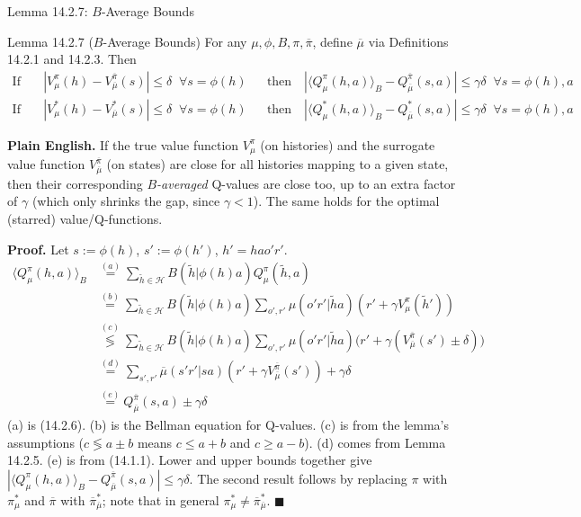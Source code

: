 \documentclass[aspectratio=169,10pt]{beamer}
\newcommand{\Hc}{\mathcal{H}}
\begin{document}
\begin{frame}[allowframebreaks]{Lemma 14.2.7: $B$-Average Bounds}
  \begin{block}{Lemma 14.2.7 ($B$-Average Bounds)}
    For any $\mu,\phi,B,\pi,\overline\pi$, define $\overline\mu$ via
    Definitions 14.2.1 and 14.2.3. Then
    \begin{align*}
      \text{If}\quad &|V_\mu^\pi(h)-V_{\overline\mu}^{\overline\pi}(s)|\le\delta \;\;\forall s=\phi(h)
      &&\text{then}\quad |\langle Q_\mu^\pi(h,a)\rangle_B - Q_{\overline\mu}^{\overline\pi}(s,a)| \le \gamma\delta \;\;\forall s=\phi(h),a\\
      \text{If}\quad &|V_\mu^*(h)-V_{\overline\mu}^*(s)|\le\delta \;\;\forall s=\phi(h)
      &&\text{then}\quad |\langle Q_\mu^*(h,a)\rangle_B - Q_{\overline\mu}^*(s,a)| \le \gamma\delta \;\;\forall s=\phi(h),a
    \end{align*}
  \end{block}
  \textbf{Plain English.} If the true value function $V^\pi_\mu$ (on
  histories) and the surrogate value function $V^{\overline\pi}_{\overline\mu}$
  (on states) are close for all histories mapping to a given state, then
  their corresponding \emph{$B$-averaged} Q-values are close too, up to an
  extra factor of $\gamma$ (which only shrinks the gap, since $\gamma<1$).
  The same holds for the optimal (starred) value/Q-functions.

  \framebreak

  \textbf{Proof.} Let $s:=\phi(h)$, $s':=\phi(h')$, $h'=hao'r'$.
  \begin{align*}
    \langle Q_\mu^\pi(h,a)\rangle_B
      &\overset{(a)}{=} \sum_{\tilde h\in\Hc}B(\tilde h|\phi(h)a)Q_\mu^\pi(\tilde h,a) \\
      &\overset{(b)}{=} \sum_{\tilde h\in\Hc}B(\tilde h|\phi(h)a)\sum_{o',r'}\mu(o'r'|\tilde ha)(r'+\gamma V_\mu^\pi(\tilde h')) \\
      &\overset{(c)}{\lessgtr} \sum_{\tilde h\in\Hc}B(\tilde h|\phi(h)a)\sum_{o',r'}\mu(o'r'|\tilde ha)\big(r'+\gamma(V_{\overline\mu}^{\overline\pi}(s')\pm\delta)\big) \\
      &\overset{(d)}{=} \sum_{s',r'}\overline\mu(s'r'|sa)(r'+\gamma V_{\overline\mu}^{\overline\pi}(s')) + \gamma\delta \\
      &\overset{(e)}{=} Q_{\overline\mu}^{\overline\pi}(s,a) \pm \gamma\delta
  \end{align*}
  (a) is (14.2.6). (b) is the Bellman equation for Q-values. (c) is from
  the lemma's assumptions ($c\lessgtr a\pm b$ means $c\le a+b$ and
  $c\ge a-b$). (d) comes from Lemma 14.2.5. (e) is from (14.1.1). Lower and
  upper bounds together give
  $|\langle Q_\mu^\pi(h,a)\rangle_B - Q_{\overline\mu}^{\overline\pi}(s,a)|\le\gamma\delta$.
  The second result follows by replacing $\pi$ with $\pi^*_\mu$ and
  $\overline\pi$ with $\overline\pi^*_{\overline\mu}$; note that in
  general $\pi^*_\mu\neq\overline\pi^*_{\overline\mu}$. $\blacksquare$
\end{frame}
\end{document}
